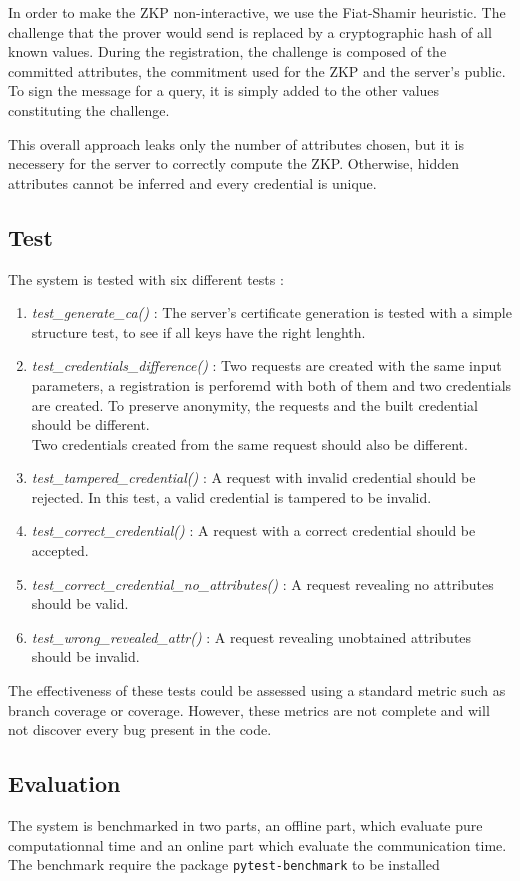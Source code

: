 \documentclass[10pt,conference,compsocconf]{IEEEtran}
\begin{document}
In order to make the ZKP non-interactive, we use the Fiat-Shamir heuristic. The challenge that the prover would send is replaced by a cryptographic hash of all known values. During the registration, the challenge is composed of the committed attributes, the commitment used for the ZKP and the server's public. To sign the message for a query, it is simply added to the other values constituting the challenge. 

This overall approach leaks only the number of attributes chosen, but it is necessery for the server to correctly compute the ZKP. Otherwise, hidden attributes cannot be inferred and every credential is unique.

\subsection{Test}
The system is tested with six different tests : 
\begin{enumerate}
    \item \textit{test\_generate\_ca()} : The server's certificate generation is tested with a simple structure test, to see if all keys have the right lenghth.
    \item \textit{test\_credentials\_difference()} : Two requests are created with the same input parameters, a registration is perforemd with both of them and two credentials are created. To preserve anonymity, the requests and the built credential should be different. \\ Two credentials created from the same request should also be different.
    \item \textit{test\_tampered\_credential()} : A request with invalid credential should be rejected. In this test, a valid credential is tampered to be invalid.
    \item \textit{test\_correct\_credential()} : A request with a correct credential should be accepted.
    \item \textit{test\_correct\_credential\_no\_attributes()} : A request revealing no attributes should be valid.
    \item \textit{test\_wrong\_revealed\_attr()} : A request revealing unobtained attributes should be invalid.
\end{enumerate}
The effectiveness of these tests could be assessed using a standard metric such as branch coverage or coverage. However, these metrics are not complete and will not discover every bug present in the code.


\subsection{Evaluation}
The system is benchmarked in two parts, an offline part, which evaluate pure computationnal time and an online part which evaluate the communication time. The benchmark require the package \verb|pytest-benchmark| to be installed
\end{document}
